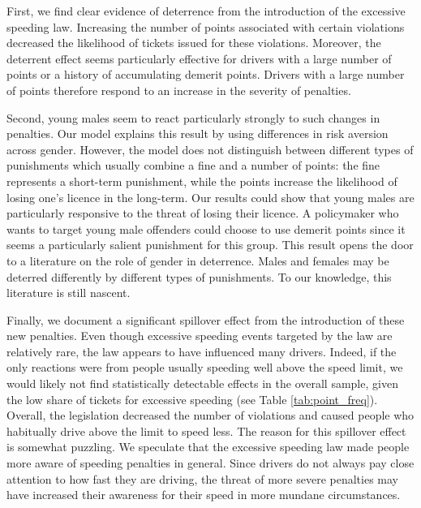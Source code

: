 \documentclass{cje}
\begin{document}
First, we find clear evidence of deterrence from the introduction of the excessive speeding law. 
Increasing the number of points associated with certain violations 
decreased the likelihood of tickets issued for these violations. Moreover, the deterrent effect seems particularly effective for drivers with a large number of points or a history of accumulating demerit points. 
Drivers with a large number of points therefore respond to an increase in the severity of penalties.

Second, young males seem to react particularly strongly to such changes in penalties. 
Our model explains this result by using differences in risk aversion across gender. 
However, the model does not distinguish between different types of punishments 
which usually combine a fine and a number of points: 
the fine represents a short-term punishment, 
while the points increase the likelihood of losing one’s licence in the long-term. 
Our results could show that young males are particularly responsive 
to the threat of losing their licence. 
A policymaker who wants to target young male offenders could choose to use demerit points 
since it seems a particularly salient punishment for this group. 
This result opens the door to a literature on the role of gender in deterrence. 
Males and females may be deterred differently by different types of punishments. 
To our knowledge, this literature is still nascent.

Finally, we document a significant spillover effect 
from the introduction of these new penalties. 
Even though excessive speeding events targeted by the law are relatively rare, 
the law appears to have influenced many drivers. 
Indeed, if the only reactions were from people usually speeding well above the speed limit, 
we would likely not find statistically detectable effects in the overall sample, 
given the low share of tickets for excessive speeding 
(see Table \ref{tab:point_freq}). 
Overall, the legislation decreased the number of violations 
and caused people who habitually drive above the limit to speed less. 
The reason for this spillover effect is somewhat puzzling. 
We speculate that the excessive speeding law made people more aware of speeding penalties in general. 
Since drivers do not always pay close attention to how fast they are driving, 
the threat of more severe penalties may have increased their 
awareness for their speed in more mundane circumstances.



\vfill
\eject


\clearpage





\vfill
\eject

\end{document}
